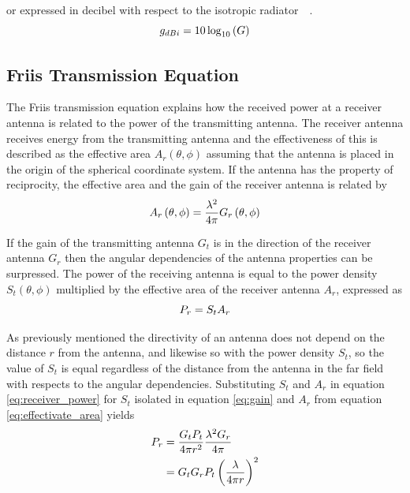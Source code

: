 or expressed in decibel with respect to the isotropic radiator~\cite[p. 10]{ant_beam_form}~\cite[pp. 1.8-1.10]{ant_eng_hk}.
\begin{equation} \label{eq:gain_dbi}
    g_{dBi} = 10 \log_{10}\left(G\right)
    \tagaddtext{[\si{\decibel}]}
\end{equation}

\subsection{Friis Transmission Equation}
The Friis transmission equation explains how the received power at a receiver antenna is related to the power of the transmitting antenna. The receiver antenna receives energy from the transmitting antenna and the effectiveness of this is described as the effective area $A_r\left( \theta, \phi \right)$ assuming that the antenna is placed in the origin of the spherical coordinate system. If the antenna has the property of reciprocity, the effective area and the gain of the receiver antenna is related by 
\begin{equation} \label{eq:effectivate_area}
    A_r \left( \theta, \phi \right) = \frac{\lambda^2}{4 \pi} G_r \left( \theta, \phi \right)
    \tagaddtext{[\si{\meter\squared}]}
\end{equation}

If the gain of the transmitting antenna $G_t$ is in the direction of the receiver antenna $G_r$ then the angular dependencies of the antenna properties can be surpressed. The power of the receiving antenna is equal to the power density $S_t \left(\theta, \phi\right)$ multiplied by the effective area of the receiver antenna $A_r$, expressed as
\begin{equation} \label{eq:receiver_power}
    P_r = S_t A_r
    \tagaddtext{[\si{\watt}]}
\end{equation} 

As previously mentioned the directivity of an antenna does not depend on the distance $r$ from the antenna, and likewise so with the power density $S_t$, so the value of $S_t$ is equal regardless of the distance from the antenna in the far field with respects to the angular dependencies. Substituting $S_t$ and $A_r$ in equation \ref{eq:receiver_power} for $S_t$ isolated in equation \ref{eq:gain} and $A_r$ from equation \ref{eq:effectivate_area} yields
\begin{equation} \label{eq:friis}
    \begin{split}
        P_r & = \frac{G_t P_t}{4 \pi r^2} \frac{\lambda^2 G_r}{4 \pi} \\
        & = G_t  G_r P_t \left( \frac{\lambda}{4 \pi r} \right)^2
        \tagaddtext{[\si{\watt}]}
    \end{split}
\end{equation} 

